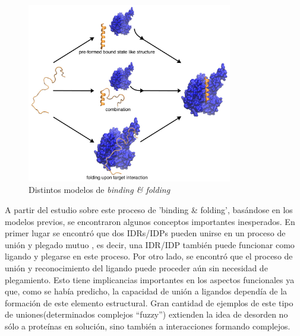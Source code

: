 \begin{figure}[h]
\centering
\includegraphics[width=0.8\textwidth]{img/PSE-MoRE.jpg} 
\caption{Distintos modelos de \textit{binding \& folding}} 
\label{idpBinding}
\end{figure}




A partir del estudio sobre este proceso de 'binding \& folding', basándose en los modelos previos, se encontraron algunos conceptos importantes inesperados.
En primer lugar se encontró que dos IDRs/IDPs pueden unirse en un proceso de unión y plegado mutuo \cite{bhattacherjee2012coupled},
es decir, una IDR/IDP también puede funcionar como ligando y plegarse en este proceso. 
Por otro lado, se encontró que el proceso de unión y reconocimiento del ligando puede proceder aún sin necesidad de plegamiento. 
Esto tiene implicancias importantes en los aspectos funcionales ya que, como se había predicho, la capacidad de unión a ligandos dependía de la formación de este elemento estructural.
Gran cantidad de ejemplos de este tipo de uniones(determinados complejos ``fuzzy'') extienden la idea de desorden no sólo a proteínas en solución, sino también a interacciones formando complejos. 









